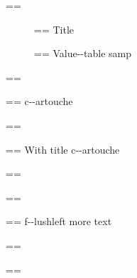 \documentclass{book}
\makeatletter
\newcommand\Texinfotablestylesamp[1]{\ifstrempty{#1}{}{`\texttt{#1}'}}%
\newenvironment{Texinfopreformatted}{%
  \par\GNUTobeylines\obeyspaces\frenchspacing\parskip=\z@\parindent=\z@}{}
{\catcode`\^^M=13 \gdef\GNUTobeylines{\catcode`\^^M=13 \def^^M{\null\par}}}
\newenvironment{Texinfoindented}{\begin{list}{}{}\item\relax}{\end{list}}
\renewcommand{\_}{\Texinfounderscore\discretionary{}{}{}}
\makeatother
\begin{document}
\begin{Texinfoindented}
\begin{description}
\end{description}
\begin{Texinfopreformatted}%
\ttfamily 
\end{Texinfopreformatted}
\begin{description}
\item[] \begin{Texinfopreformatted}%
\ttfamily Title
\end{Texinfopreformatted}
\item[{\parbox[b]{\linewidth}{%
\Texinfotablestylesamp{a{-}{-}samp}\\
\Texinfotablestylesamp{a2{-}{-}samp}}}]
\begin{Texinfopreformatted}%
\ttfamily Value{-}{-}table samp
\end{Texinfopreformatted}
\end{description}
\begin{Texinfopreformatted}%
\ttfamily 
\end{Texinfopreformatted}
\begin{mdframed}[style=Texinfocartouche]
\begin{Texinfopreformatted}%
\ttfamily c{-}{-}artouche
\end{Texinfopreformatted}
\end{mdframed}
\begin{Texinfopreformatted}%
\ttfamily 
\end{Texinfopreformatted}
\begin{mdframed}[style=Texinfocartouche, frametitle={Tit--le \emph{of box}}]
\begin{Texinfopreformatted}%
\ttfamily With title c{-}{-}artouche
\end{Texinfopreformatted}
\end{mdframed}
\begin{Texinfopreformatted}%
\ttfamily 
\end{Texinfopreformatted}
\begin{flushleft}
\begin{Texinfopreformatted}%
\begin{Texinfopreformatted}%
\ttfamily f{-}{-}lushleft
more text
\end{Texinfopreformatted}
\end{Texinfopreformatted}
\end{flushleft}
\begin{Texinfopreformatted}%
\ttfamily 
\end{Texinfopreformatted}
\begin{flushright}
\begin{Texinfopreformatted}%

\end{Texinfopreformatted}
\end{flushright}
\end{Texinfoindented}
\end{document}
